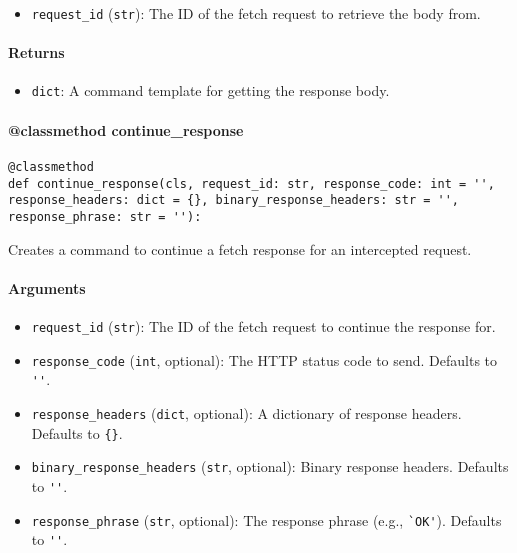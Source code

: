 \documentclass{article}
\begin{document}
\begin{itemize}
    \item \lstinline[style=pythonstyle]|request_id| (\lstinline[style=pythonstyle]|str|): The ID of the fetch request to retrieve the body from.
\end{itemize}

\paragraph{Returns}

\begin{itemize}
    \item \lstinline[style=pythonstyle]|dict|: A command template for getting the response body.
\end{itemize}

\paragraph{@classmethod continue\_response}

\begin{lstlisting}[style=pythonstyle]
@classmethod
def continue_response(cls, request_id: str, response_code: int = '', response_headers: dict = {}, binary_response_headers: str = '', response_phrase: str = ''):
\end{lstlisting}

\noindent Creates a command to continue a fetch response for an intercepted request.

\paragraph{Arguments}

\begin{itemize}
    \item \lstinline[style=pythonstyle]|request_id| (\lstinline[style=pythonstyle]|str|): The ID of the fetch request to continue the response for.
    \item \lstinline[style=pythonstyle]|response_code| (\lstinline[style=pythonstyle]|int|, optional): The HTTP status code to send. Defaults to \lstinline[style=pythonstyle]|''|.
    \item \lstinline[style=pythonstyle]|response_headers| (\lstinline[style=pythonstyle]|dict|, optional): A dictionary of response headers. Defaults to \lstinline[style=pythonstyle]|{}|.
    \item \lstinline[style=pythonstyle]|binary_response_headers| (\lstinline[style=pythonstyle]|str|, optional): Binary response headers. Defaults to \lstinline[style=pythonstyle]|''|.
    \item \lstinline[style=pythonstyle]|response_phrase| (\lstinline[style=pythonstyle]|str|, optional): The response phrase (e.g., \lstinline[style=pythonstyle]|`OK'|). Defaults to \lstinline[style=pythonstyle]|''|.
\end{itemize}
\end{document}
